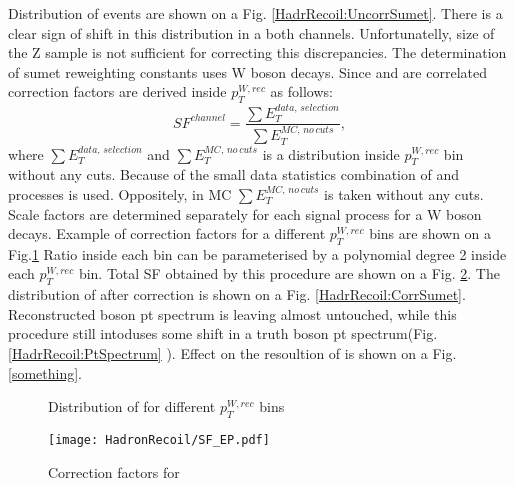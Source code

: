 Distribution of \sumet  events are shown on a Fig. \ref{HadrRecoil:UncorrSumet}. There is a clear sign of shift in this distribution in a both channels. Unfortunatelly, size of the Z sample is not sufficient for correcting this discrepancies. 
The determination of sumet reweighting constants uses W boson decays. Since \sumet and \ptw are correlated correction factors are derived inside $p_T^{W, rec}$  as follows:
\begin{equation}
SF^{channel}=\frac{\sum E_T^{data, \, selection} }{\sum E_T^{MC,\, no\, cuts} },
\end{equation}
where $\sum E_T^{data,\, selection} $ and $\sum E_T^{MC,\, no\, cuts}$ is a \sumet distribution inside $p_T^{W, rec}$ bin without any cuts.  Because of the small data statistics combination of  \wenu and \wmunu processes is used. Oppositely, in MC $\sum E_T^{MC,\, no\, cuts} $ is taken without any cuts. Scale factors are determined separately for each signal process for a W boson decays. Example of correction factors for a different $p_T^{W, rec}$ bins are shown on a Fig.\ref{ris:SumEtCorPtW} Ratio inside each bin can be parameterised by a polynomial degree 2 inside each $p_T^{W, rec}$ bin.  Total SF obtained by this procedure are shown on a Fig. \ref{SFWplusenu}. The distribution of \sumet after correction is shown on a Fig. \ref{HadrRecoil:CorrSumet}. Reconstructed boson pt spectrum is leaving almost untouched, while this procedure still intoduses some shift in a truth boson pt spectrum(Fig. \ref{HadrRecoil:PtSpectrum} ). Effect on the resoultion of \uperp is shown on a Fig. \ref{something}.
\begin{figure}[!tbp]
\begin{minipage}[h]{0.49\linewidth}
\end{minipage}
\hfill
\begin{minipage}[h]{0.49\linewidth}
\end{minipage}
\caption{Distribution of \sumet for different $p_T^{W, rec}$ bins}
\label{ris:SumEtCorPtW}
\end{figure}

\begin{figure}[!tbp]
\centering
\texttt{[image: HadronRecoil/SF\_EP.pdf]}
\caption{Correction factors for \wenu}
\label{SFWplusenu}
\end{figure}

